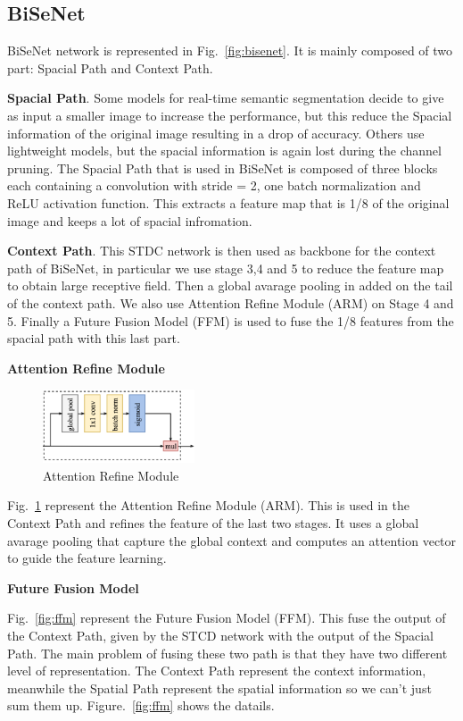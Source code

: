 \documentclass[conference]{IEEEtran}
\begin{document}
\subsection{BiSeNet}

BiSeNet network is represented in Fig.~\ref{fig:bisenet}. It is mainly composed of two part: Spacial Path and Context Path. 

\textbf{Spacial Path}.
Some models for real-time semantic segmentation decide to give as input a smaller image to increase the performance, but this reduce the Spacial
information of the original image resulting in a drop of accuracy. Others use lightweight models, but the spacial information is again
lost during the channel pruning. The Spacial Path that is used in BiSeNet is composed of three blocks each containing a convolution
with stride = 2, one batch normalization and ReLU activation function. This extracts a feature map that is 1/8 of the original image and
keeps a lot of spacial infromation. 

\textbf{Context Path}.
This STDC network is then used as backbone for the context path of BiSeNet, in particular we use stage 3,4 and 5 to reduce the 
feature map to obtain large receptive field. Then a global avarage pooling in added on the tail of the context path. We also use
Attention Refine Module (ARM) on Stage 4 and 5. Finally a Future Fusion Model (FFM) is used to fuse the 1/8
features from the spacial path with this last part.

\textbf{Attention Refine Module}
\begin{figure}[tp]
\centerline{\includegraphics[width=0.4\textwidth]{figures/ARM.pdf.png}}
\caption{Attention Refine Module}
\label{fig:arm}
\end{figure}

Fig.~\ref{fig:arm} represent the Attention Refine Module (ARM). This is used in the Context Path and refines the feature of the last
two stages. It uses a global avarage pooling that capture the global context and computes an attention vector to guide the feature learning.

\textbf{Future Fusion Model}

Fig.~\ref{fig:ffm} represent the Future Fusion Model (FFM). This fuse the output of the Context Path, given by the STCD network with 
the output of the Spacial Path. The main problem of fusing these two path is that they have two different level of representation. The
Context Path represent the context information, meanwhile the Spatial Path represent the spatial information so we can't just sum them
up. Figure.~\ref{fig:ffm} shows the datails. 
\end{document}
